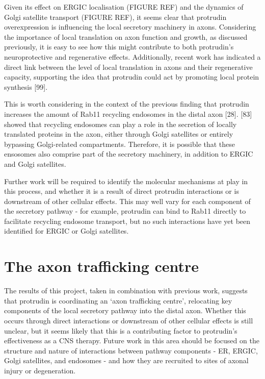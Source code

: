 \documentclass[
  12pt,
  a4paper,
]{book}
\begin{document}
Given its effect on ERGIC localisation (FIGURE REF) and the dynamics of Golgi satellite transport (FIGURE REF), it seems clear that protrudin overexpression is influencing the local secretory machinery in axons. Considering the importance of local translation on axon function and growth, as discussed previously, it is easy to see how this might contribute to both protrudin's neuroprotective and regenerative effects. Additionally, recent work has indicated a direct link between the level of local translation in axons and their regenerative capacity, supporting the idea that protrudin could act by promoting local protein synthesis {[}99{]}.

This is worth considering in the context of the previous finding that protrudin increases the amount of Rab11 recycling endosomes in the distal axon {[}28{]}. {[}83{]} showed that recycling endosomes can play a role in the secretion of locally translated proteins in the axon, either through Golgi satellites or entirely bypassing Golgi-related compartments. Therefore, it is possible that these ensosomes also comprise part of the secretory machinery, in addition to ERGIC and Golgi satellites.

Further work will be required to identify the molecular mechanisms at play in this process, and whether it is a result of direct protrudin interactions or is downstream of other cellular effects. This may well vary for each component of the secretory pathway - for example, protrudin can bind to Rab11 directly to facilitate recycling endosome transport, but no such interactions have yet been identified for ERGIC or Golgi satellites.

\hypertarget{the-axon-trafficking-centre}{%
\section{The axon trafficking centre}\label{the-axon-trafficking-centre}}

The results of this project, taken in combination with previous work, suggests that protrudin is coordinating an `axon trafficking centre', relocating key components of the local secretory pathway into the distal axon. Whether this occurs through direct interactions or downstream of other cellular effects is still unclear, but it seems likely that this is a contributing factor to protrudin's effectiveness as a CNS therapy. Future work in this area should be focused on the structure and nature of interactions between pathway components - ER, ERGIC, Golgi satellites, and endosomes - and how they are recruited to sites of axonal injury or degeneration.
\end{document}

